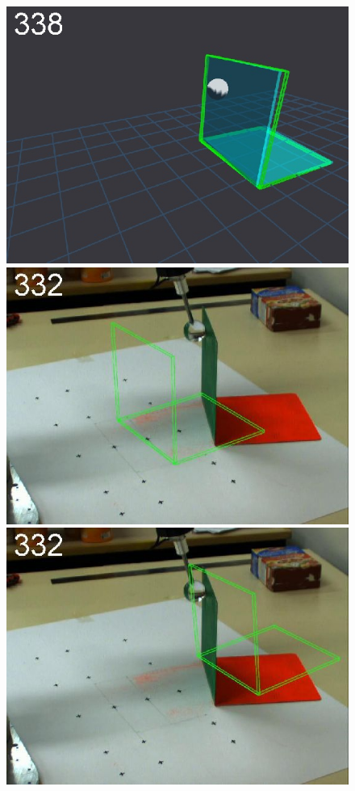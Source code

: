\begin{figure}[tb]
{\includegraphics[width=\imgBXwid]{./B1_3exp_20_5}
\includegraphics[width=\imgBXwid]{./B2_1exp_58_5}
\includegraphics[width=\imgBXwid]{./B2_2exp_58_5}
}
\end{figure}
